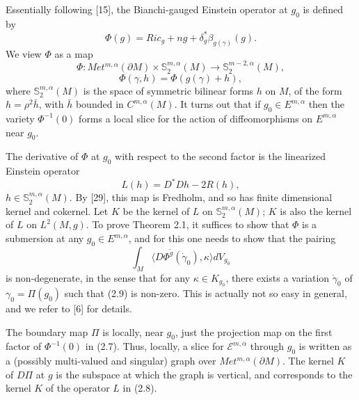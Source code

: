 \documentclass[11pt,amsfonts]{amsart}
\begin{document}
 Essentially following [15], the Bianchi-gauged Einstein 
operator at $g_{0}$ is defined by 
\begin{equation} \label{e2.6}
\Phi (g) = Ric_{g} + ng + \delta_{g}^{*}\beta_{g(\gamma )}(g). 
\end{equation}
We view $\Phi$ as a map
\begin{equation} \label{e2.7}
\Phi : Met^{m,\alpha}(\partial M)\times {\mathbb S}_{2}^{m,\alpha}(M) 
\rightarrow  {\mathbb S}_{2}^{m-2,\alpha}(M), 
\end{equation}
$$\Phi (\gamma , h) = \Phi (g(\gamma ) + h), $$
where ${\mathbb S}_{2}^{m,\alpha}(M)$ is the space of symmetric bilinear 
forms $h$ on $M$, of the form $h = \rho^{2}\bar h$, with $\bar h$ 
bounded in $C^{m,\alpha}(M)$. It turns out that if $g_{0}\in 
E^{m,\alpha}$ then the variety $\Phi^{-1}(0)$ forms a local slice for 
the action of diffeomorphisms on $E^{m,\alpha}$ near $g_{0}$. 

 The derivative of $\Phi$ at $g_{0}$ with respect to the second factor 
is the linearized Einstein operator 
\begin{equation} \label{e2.8}
L(h) = D^{*}Dh - 2R(h), 
\end{equation}
$h\in{\mathbb S}_{2}^{m,\alpha}(M).$ By [29], this map is Fredholm, and so 
has finite dimensional kernel and cokernel. Let $K$ be the kernel of 
$L$ on ${\mathbb S}_{2}^{m,\alpha}(M)$; $K$ is also the kernel of $L$ on 
$L^{2}(M, g)$. To prove Theorem 2.1, it suffices to show that $\Phi$ 
is a submersion at any $g_{0}\in E^{m,\alpha}$, and for this one needs 
to show that the pairing
\begin{equation} \label{e2.9}
\int_{M}\langle D\Phi^{\widetilde g}(\dot \gamma_{0}), \kappa \rangle 
dV_{g_{0}}
\end{equation}
is non-degenerate, in the sense that for any $\kappa  \in  K_{g_{0}}$, 
there exists a variation $\dot \gamma_{0}$ of $\gamma_{0} = \Pi (g_{0})$ 
such that (2.9) is non-zero. This is actually not so easy in general, and 
we refer to [6] for details. 

\medskip

 The boundary map $\Pi$ is locally, near $g_{0}$, just the projection 
map on the first factor of $\Phi^{-1}(0)$ in (2.7). Thus, locally, a 
slice for ${\mathcal E}^{m,\alpha}$ through $g_{0}$ is written as a 
(possibly multi-valued and singular) graph over 
$Met^{m,\alpha}(\partial M)$. The kernel $K$ of $D\Pi$ at $g$ is the 
subspace at which the graph is vertical, and corresponds to the kernel 
$K$ of the operator $L$ in (2.8). 
\end{document}
